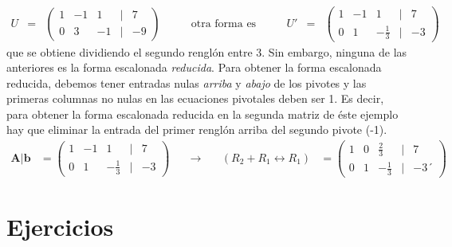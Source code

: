 \documentclass[
]{article}
\begin{document}
\[
\begin{array}{ccc}
U &= & \begin{pmatrix} 
                   1   & -1 &  1  &\big|& 7   \\
                  0   &  3 & -1  &\big|& -9   
        \end{pmatrix}
\end{array} 
  \quad\quad\mbox{ otra forma es }\quad\quad
\begin{array}{ccc}
U' &= & \begin{pmatrix} 
                   1   & -1 &  1  &\big|& 7   \\
                  0   &  1 & -\frac{1}{3}  &\big|& -3   
        \end{pmatrix}
\end{array}
\] que se obtiene dividiendo el segundo renglón entre \(3\). Sin
embargo, ninguna de las anteriores es la forma escalonada
\emph{reducida}. Para obtener la forma escalonada reducida, debemos
tener entradas nulas \emph{arriba} y \emph{abajo} de los pivotes y las
primeras columnas no nulas en las ecuaciones pivotales deben ser 1. Es
decir, para obtener la forma escalonada reducida en la segunda matriz de
éste ejemplo hay que eliminar la entrada del primer renglón arriba del
segundo pivote (-1). \begin{equation*}
 \begin{array}{ccccc}
   \mathbf{A}|\mathbf{b} & = \begin{pmatrix}
                                   1   & -1 &  1            &\big|& 7   \\
                                   0   &  1 & -\frac{1}{3}  &\big|& -3   
                                \end{pmatrix} & \quad\rightarrow \quad
    & (R_2 + R_1 \leftrightarrow R_1)  
        &= \begin{pmatrix}
                                  1   &  0 &  \frac{2}{3}  &|& 7   \\
                                  0   &  1 & -\frac{1}{3}  &|& -3´    
                                \end{pmatrix}
 \end{array}
\end{equation*}

\hypertarget{ejercicios-2}{%
\section{Ejercicios}\label{ejercicios-2}}
\end{document}

